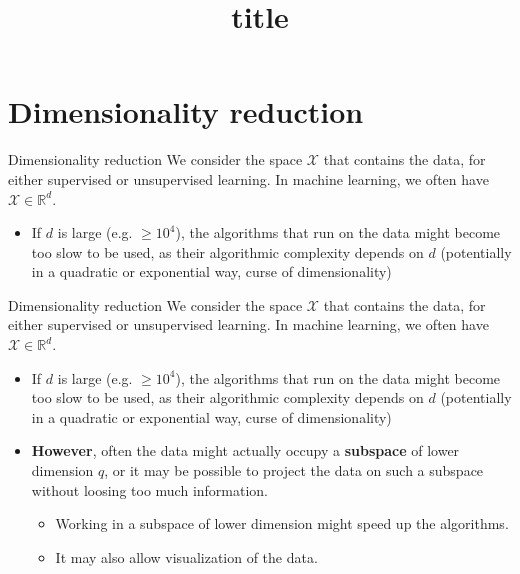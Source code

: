 \documentclass[usenames,dvipsnames]{beamer}
\title[FTML]{title}
\date{} %
\begin{document}
\begin{frame}
\titlepage %
\end{frame}

\begin{frame}
\tableofcontents %
\end{frame}


\section{Dimensionality reduction}%
\frame{\tableofcontents[currentsection]}
\label{sub:dimensionality_reduction}

\begin{frame}{Dimensionality reduction}
    We consider the space $ \mathcal{X} $ that contains the data, for either supervised or unsupervised learning. In machine learning, we often have $ \mathcal{X} \in \mathbb{R}^d$.
    \begin{itemize}
	\item If $d$ is large (e.g. $\geq 10^4$), the algorithms that run on the data might become too slow to be used, as their algorithmic complexity depends on $d$ (potentially in a quadratic or exponential way, curse of dimensionality)
    \end{itemize}
\end{frame}

\begin{frame}{Dimensionality reduction}
    We consider the space $ \mathcal{X} $ that contains the data, for either supervised or unsupervised learning. In machine learning, we often have $ \mathcal{X} \in \mathbb{R}^d$.
    \begin{itemize}
	\item If $d$ is large (e.g. $\geq 10^4$), the algorithms that run on the data might become too slow to be used, as their algorithmic complexity depends on $d$ (potentially in a quadratic or exponential way, curse of dimensionality)
	\item \textbf{{However}}, often the data might actually occupy a \textbf{{subspace}} of lower dimension $q$, or it may be possible to project the data on such a subspace without loosing too much information.
	    \begin{itemize}
		\item Working in a subspace of lower dimension might speed up the algorithms.
		    \item It may also allow visualization of the data.
	    \end{itemize}
    \end{itemize}
\end{frame}
\end{document}
